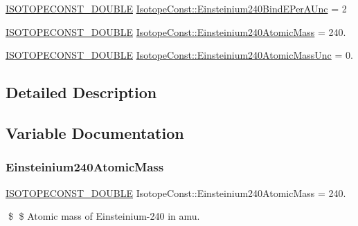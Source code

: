 \begin{DoxyCompactItemize}
\mbox{\hyperlink{group___isotope_const-_macros_ga8f45a7272ce02c0b4c65c44636ed719a}{I\+S\+O\+T\+O\+P\+E\+C\+O\+N\+S\+T\+\_\+\+D\+O\+U\+B\+LE}} \mbox{\hyperlink{group___isotope_const-_einsteinium-_es240_ga5d315f3a68b38fac0c15861be102b855}{Isotope\+Const\+::\+Einsteinium240\+Bind\+E\+Per\+A\+Unc}} = 2
\item 
\mbox{\hyperlink{group___isotope_const-_macros_ga8f45a7272ce02c0b4c65c44636ed719a}{I\+S\+O\+T\+O\+P\+E\+C\+O\+N\+S\+T\+\_\+\+D\+O\+U\+B\+LE}} \mbox{\hyperlink{group___isotope_const-_einsteinium-_es240_ga2fe5de2e1a596a34683d9de015290919}{Isotope\+Const\+::\+Einsteinium240\+Atomic\+Mass}} = 240.
\item 
\mbox{\hyperlink{group___isotope_const-_macros_ga8f45a7272ce02c0b4c65c44636ed719a}{I\+S\+O\+T\+O\+P\+E\+C\+O\+N\+S\+T\+\_\+\+D\+O\+U\+B\+LE}} \mbox{\hyperlink{group___isotope_const-_einsteinium-_es240_ga080a2fb9dd041ac6aaffc54269672d3e}{Isotope\+Const\+::\+Einsteinium240\+Atomic\+Mass\+Unc}} = 0.
\end{DoxyCompactItemize}


\subsection{Detailed Description}


\subsection{Variable Documentation}
\mbox{\label{group___isotope_const-_einsteinium-_es240_ga2fe5de2e1a596a34683d9de015290919}} 
\subsubsection{\texorpdfstring{Einsteinium240\+Atomic\+Mass}{Einsteinium240AtomicMass}}
{\footnotesize\ttfamily \mbox{\hyperlink{group___isotope_const-_macros_ga8f45a7272ce02c0b4c65c44636ed719a}{I\+S\+O\+T\+O\+P\+E\+C\+O\+N\+S\+T\+\_\+\+D\+O\+U\+B\+LE}} Isotope\+Const\+::\+Einsteinium240\+Atomic\+Mass = 240.}

\$ \$ Atomic mass of Einsteinium-\/240 in amu. \mbox{\label{group___isotope_const-_einsteinium-_es240_ga080a2fb9dd041ac6aaffc54269672d3e}} 
